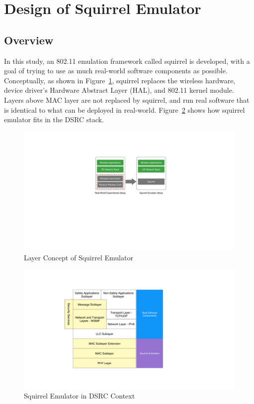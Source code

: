 \documentclass[12pt]{report}
\begin{document}
\section{Design of Squirrel Emulator}
\subsection{Overview}

In this study, an 802.11 emulation framework called squirrel is developed, with a goal of trying to use as much real-world software components as possible. Conceptually, as shown in Figure~\ref{fig:squirrel_concept}, squirrel replaces the wireless hardware, device driver's Hardware Abstract Layer (HAL), and 802.11 kernel module. Layers above MAC layer are not replaced by squirrel, and run real software that is identical to what can be deployed in real-world. Figure~\ref{fig:squirrel_dsrc} shows how squirrel emulator fits in the DSRC stack.

\begin{figure}[h]
  \begin{center}
    \includegraphics[width=.7\textwidth]{figures/squirrelConcept.pdf}
    \caption{\label{fig:squirrel_concept}Layer Concept of Squirrel Emulator}
  \end{center}
\end{figure}

\begin{figure}[h]
  \begin{center}
    \includegraphics[width=.7\textwidth]{figures/squirrelDSRC.pdf}
    \caption{\label{fig:squirrel_dsrc}Squirrel Emulator in DSRC Context}
  \end{center}
\end{figure}
\end{document}
